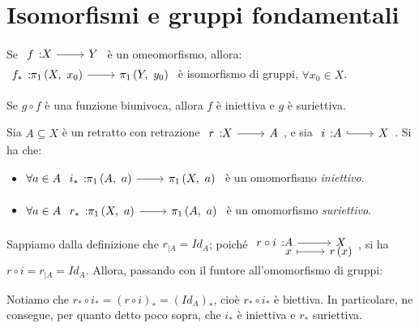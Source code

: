 \section{Isomorfismi e gruppi fondamentali}
\begin{corollary}
	Se $\funz{f}{X}{Y}$ è un omeomorfismo, allora:\\ $\funz{f_{\ast}}{\gruf{X}{x_0}}{\gruf{Y}{y_0}}$ è isomorfismo di gruppi, $\forall x_0\in X$.
\end{corollary}
\begin{remember}
	Se $g\circ f$ è una funzione biunivoca, allora $f$ è iniettiva e $g$ è suriettiva.
\end{remember}
\begin{corollary} \label{grp fond iniettiva e suriettiva}
	Sia $A\subseteq X$ è un retratto con retrazione $\funz{r}{X}{A}$, e sia $\incl{i}{A}{X}$. Si ha che:
	\begin{itemize}
		\item $\forall a\in A\ \funz{i_{\ast}}{\gruf{A}{a}}{\gruf{X}{a}}$ è un omomorfismo \textit{iniettivo}.
		\item $\forall a\in A\ \funz{r_{\ast}}{\gruf{X}{a}}{\gruf{A}{a}}$ è un omomorfismo \textit{suriettivo}.
	\end{itemize}
\end{corollary}
\begin{demonstration}
	Sappiamo dalla definizione che $r_{\mid A}=Id_A$; poiché $\funztot{r\circ i}{A}{X}{x}{r\left(x\right)}$, si ha $r\circ i=r_{\mid A}=Id_A$. Allora, passando con il funtore all'omomorfismo di gruppi:
	\begin{center}
	\end{center}
Notiamo che $r_{\ast}\circ i_{\ast}=\left(r\circ i\right)_{\ast}=\left(Id_A\right)_{\ast}$, cioè $r_{\ast}\circ i_{\ast}$ è biettiva. In particolare, ne consegue, per quanto detto poco sopra, che $i_{\ast}$ è iniettiva e $r_{\ast}$ suriettiva.
\end{demonstration}
